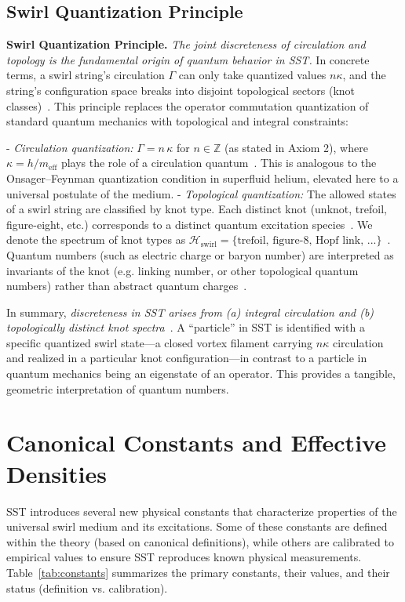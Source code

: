 \documentclass[aps,onecolumn,10pt,nofootinbib]{revtex4}
\begin{document}

	\subsection{Swirl Quantization Principle}
	\textbf{Swirl Quantization Principle.} \emph{The joint discreteness of circulation and topology is the fundamental origin of quantum behavior in SST.} In concrete terms, a swirl string’s circulation $\Gamma$ can only take quantized values $n\kappa$, and the string’s configuration space breaks into disjoint topological sectors (knot classes)~\cite{index43}. This principle replaces the operator commutation quantization of standard quantum mechanics with topological and integral constraints:

	- \emph{Circulation quantization:} $\Gamma = n\,\kappa$ for $n\in\mathbb{Z}$ (as stated in Axiom 2), where $\kappa = h/m_{\text{eff}}$ plays the role of a circulation quantum~\cite{index45}. This is analogous to the Onsager–Feynman quantization condition in superfluid helium, elevated here to a universal postulate of the medium.
	- \emph{Topological quantization:} The allowed states of a swirl string are classified by knot type. Each distinct knot (unknot, trefoil, figure-eight, etc.) corresponds to a distinct quantum excitation species~\cite{index46}. We denote the spectrum of knot types as $\mathcal{H}_{\text{swirl}} = \{\text{trefoil, figure-8, Hopf link, ...}\}$~\cite{index47}. Quantum numbers (such as electric charge or baryon number) are interpreted as invariants of the knot (e.g. linking number, or other topological quantum numbers) rather than abstract quantum charges~\cite{index48}.

	In summary, \emph{discreteness in SST arises from (a) integral circulation and (b) topologically distinct knot spectra}~\cite{index49}. A “particle” in SST is identified with a specific quantized swirl state—a closed vortex filament carrying $n\kappa$ circulation and realized in a particular knot configuration—in contrast to a particle in quantum mechanics being an eigenstate of an operator. This provides a tangible, geometric interpretation of quantum numbers.


	\section{Canonical Constants and Effective Densities}
	SST introduces several new physical constants that characterize properties of the universal swirl medium and its excitations. Some of these constants are defined within the theory (based on canonical definitions), while others are calibrated to empirical values to ensure SST reproduces known physical measurements. Table~\ref{tab:constants} summarizes the primary constants, their values, and their status (definition vs. calibration).
\end{document}
